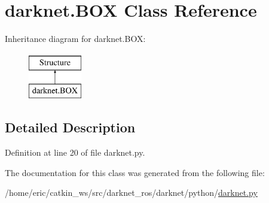 \hypertarget{classdarknet_1_1BOX}{}\section{darknet.\+B\+OX Class Reference}
\label{classdarknet_1_1BOX}
Inheritance diagram for darknet.\+B\+OX\+:\begin{figure}[H]
\begin{center}
\leavevmode
\includegraphics[height=2.000000cm]{classdarknet_1_1BOX}
\end{center}
\end{figure}


\subsection{Detailed Description}


Definition at line 20 of file darknet.\+py.



The documentation for this class was generated from the following file\+:\begin{DoxyCompactItemize}
\item 
/home/eric/catkin\+\_\+ws/src/darknet\+\_\+ros/darknet/python/\mbox{\hyperlink{darknet_8py}{darknet.\+py}}\end{DoxyCompactItemize}
